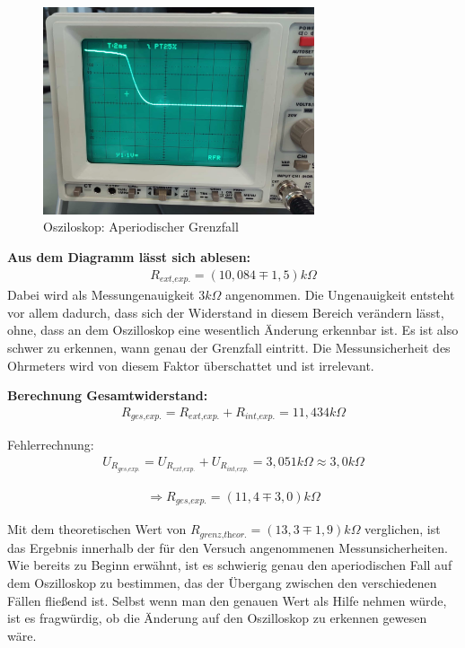 \documentclass[a4paper]{scrartcl}
\numberwithin{equation}{subsection}
\begin{document}
\begin{figure}[H]
\includegraphics[width=8cm]{Bild_Osziloskop-Grenzfall}
\centering
\caption{Osziloskop: Aperiodischer Grenzfall}
\centering
\end{figure}

\textbf{Aus dem Diagramm lässt sich ablesen:}
\begin{align*}
R_{\textit{ext,exp.}} = (10,084\mp1,5)k\Omega
\end{align*}
Dabei wird als Messungenauigkeit $3k\Omega$ angenommen. Die Ungenauigkeit entsteht vor allem dadurch, dass sich der Widerstand in diesem Bereich verändern lässt, ohne, dass an dem Oszilloskop eine wesentlich Änderung erkennbar ist. Es ist also schwer zu erkennen, wann genau der Grenzfall eintritt.
Die Messunsicherheit des Ohrmeters wird von diesem Faktor überschattet und ist irrelevant.

\textbf{Berechnung Gesamtwiderstand:}
\begin{align}
R_{\textit{ges,exp.}} = R_{\textit{ext,exp.}} + R_{\textit{int,exp.}} = 11,434k\Omega 
\end{align}

Fehlerrechnung:
\begin{align*}
U_{R_{\textit{ges,exp.}}} = U_{R_{\textit{ext,exp.}}} + U_{R_{\textit{int,exp.}}} = 3,051k\Omega \approx 3,0k\Omega
\end{align*}

\begin{align*}
\Rightarrow R_{\textit{ges,exp.}} = (11,4 \mp 3,0) k\Omega
\end{align*}

Mit dem theoretischen Wert von $R_{\textit{grenz,theor.}} = (13,3 \mp 1,9)k \Omega$ verglichen, ist das Ergebnis innerhalb der für den Versuch angenommenen Messunsicherheiten. Wie bereits zu Beginn erwähnt, ist es schwierig genau den aperiodischen Fall auf dem Oszilloskop zu bestimmen, das der Übergang zwischen den verschiedenen Fällen fließend ist. Selbst wenn man den genauen Wert als Hilfe nehmen würde, ist es fragwürdig, ob die Änderung auf den Oszilloskop zu erkennen gewesen wäre.
\end{document}
